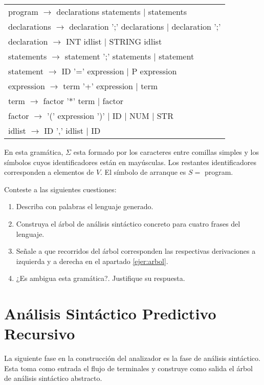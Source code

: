 \vspace{0.5cm}
\begin{tabular}{l}
program      $\rightarrow$  declarations  statements         $|$ statements\\
declarations $\rightarrow$ declaration  ';'  declarations    $|$ declaration ';'\\
declaration  $\rightarrow$ INT  idlist                       $|$ STRING   idlist\\
statements   $\rightarrow$ statement  ';'  statements        $|$ statement\\
statement    $\rightarrow$ ID '=' expression                 $|$ P  expression\\
expression   $\rightarrow$ term '+' expression               $|$ term\\
term         $\rightarrow$ factor '*' term                   $|$ factor\\
factor       $\rightarrow$ '(' expression ')' $|$ ID $|$ NUM $|$ STR\\
idlist       $\rightarrow$ ID ',' idlist $|$ ID
\end{tabular}
\vspace{0.25cm}

En esta gramática, $\Sigma$ esta formado por los caracteres entre comillas simples y 
los símbolos cuyos identificadores están en mayúsculas. Los restantes identificadores
corresponden a elementos de $V$. El símbolo de arranque es $S =$ program.

Conteste a las siguientes cuestiones:

\begin{enumerate}
\item
Describa con palabras el lenguaje generado.
\item
\label{ejer:arbol}
Construya el árbol de análisis sintáctico
concreto para cuatro frases del lenguaje.
\item
Señale a que recorridos del árbol corresponden las respectivas
derivaciones a izquierda y a derecha en el apartado \ref{ejer:arbol}.
\item
¿Es ambigua esta gramática?. Justifique su respuesta.
\end{enumerate}

\section{Análisis Sintáctico Predictivo Recursivo}
\label{section:predictivo}
La siguiente fase en la construcción del analizador es la fase de 
análisis sintáctico. Esta toma como entrada el flujo de terminales
y construye como salida el árbol de análisis sintáctico abstracto.


